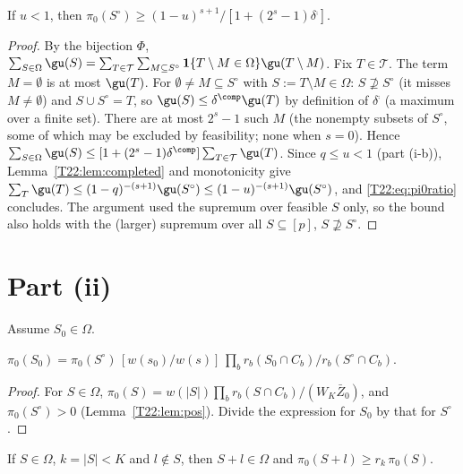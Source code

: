 \documentclass[11pt]{report}
\begin{document}
\begin{T22proposition}[(i-c)]
If $u<1$, then $\pi_0(S^\circ)\ge(1-u)^{s+1}/[1+(2^s-1)\delta^{\comp}]$.
\end{T22proposition}

\begin{proof}
By the bijection $\Phi$, $\sum_{S\in\Omega}\gu(S)=\sum_{T\in\mathcal T}\sum_{M\subseteq S^\circ}\mathbf 1\{T\setminus M\in\Omega\}\gu(T\setminus M)$. Fix $T\in\mathcal T$. The term $M=\emptyset$ is at most $\gu(T)$. For $\emptyset\ne M\subseteq S^\circ$ with $S:=T\setminus M\in\Omega$: $S\not\supseteq S^\circ$ (it misses $M\neq\emptyset$) and $S\cup S^\circ=T$, so $\gu(S)\le\delta^{\comp}\gu(T)$ by definition of $\delta^{\comp}$ (a maximum over a finite set). There are at most $2^s-1$ such $M$ (the nonempty subsets of $S^\circ$, some of which may be excluded by feasibility; none when $s=0$). Hence $\sum_{S\in\Omega}\gu(S)\le[1+(2^s-1)\delta^{\comp}]\sum_{T\in\mathcal T}\gu(T)$. Since $q\le u<1$ (part (i-b)), Lemma~\ref{T22:lem:completed} and monotonicity give $\sum_{T}\gu(T)\le(1-q)^{-(s+1)}\gu(S^\circ)\le(1-u)^{-(s+1)}\gu(S^\circ)$, and \eqref{T22:eq:pi0ratio} concludes. The argument used the supremum over feasible $S$ only, so the bound also holds with the (larger) supremum over all $S\subseteq[p]$, $S\not\supseteq S^\circ$.
\end{proof}

\section{Part (ii)}

Assume $S_0\in\Omega$.

\begin{T22proposition}[(ii-a)]
$\pi_0(S_0)=\pi_0(S^\circ)\,[w(s_0)/w(s)]\,\prod_b r_b(S_0\cap C_b)/r_b(S^\circ\cap C_b)$.
\end{T22proposition}

\begin{proof}
For $S\in\Omega$, $\pi_0(S)=w(|S|)\prod_b r_b(S\cap C_b)/(W_K\bar Z_0)$, and $\pi_0(S^\circ)>0$ (Lemma~\ref{T22:lem:pos}). Divide the expression for $S_0$ by that for $S^\circ$.
\end{proof}

\begin{T22lemma}\label{T22:lem:pi0add}
If $S\in\Omega$, $k=|S|<K$ and $l\notin S$, then $S+l\in\Omega$ and $\pi_0(S+l)\ge r_k\,\pi_0(S)$.
\end{T22lemma}
\end{document}
